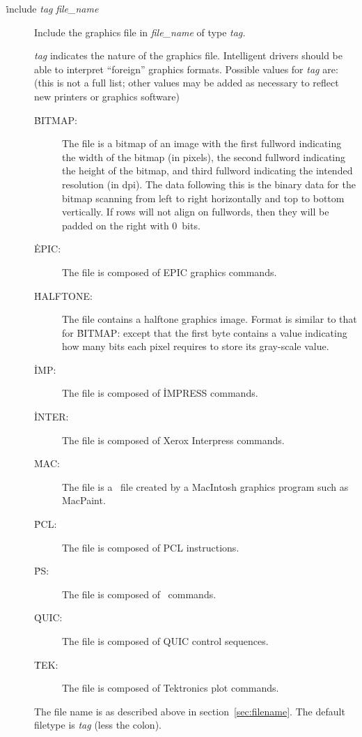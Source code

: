 \begin{description}
\item[\.{include} {\it tag\/} {\it file\_name}] Include the graphics
         file in {\it file\_name\/} of type {\it tag.\/}

         {\it tag\/} indicates the nature of the graphics file.
         Intelligent drivers should be able to interpret ``foreign''
         graphics formats. Possible values for {\it tag\/} are: (this is
         not a full list; other values may be added as necessary to
         reflect new printers or graphics software)
         \begin{description}
         \item[\.{BITMAP:}] The file is a bitmap of an image with the
                   first fullword indicating the width of the bitmap
                   (in pixels), the second fullword indicating the
                   height of the bitmap, and third fullword indicating
                   the intended resolution (in dpi). The data following
                   this is the binary data for the bitmap scanning from
                   left to right horizontally and top to bottom
                   vertically. If rows will not align on fullwords,
                   then they will be padded on the right with 0~bits.
         \item[\.{EPIC:}] The file is composed of EPIC graphics commands.
         \item[\.{HALFTONE:}] The file contains a halftone graphics
                   image. Format is similar to that for \.{BITMAP:}
                   except that the first byte contains a value indicating
                   how many bits each pixel requires to store its
                   gray-scale value.
         \item[\.{IMP:}] The file is composed of \.{IMPRESS} commands.
         \item[\.{INTER:}] The file is composed of Xerox Interpress
                   commands.
         \item[\.{MAC:}] The file is a \PS\ file created by a MacIntosh
                   graphics program such as MacPaint.
         \item[\.{PCL:}] The file is composed of PCL instructions.
         \item[\.{PS:}] The file is composed of \PS\ commands.
         \item[\.{QUIC:}] The file is composed of {\sf QUIC} control
                   sequences.
         \item[\.{TEK:}] The file is composed of Tektronics plot
                   commands.
         \end{description}

         The file name is as described above in
         section~\ref{sec:filename}. The default filetype is {\it tag\/}
         (less the colon).
\end{description}

